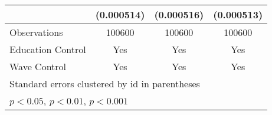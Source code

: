 {\begin{tabular}{l*{3}{c}}
                    &  (0.000514)         &  (0.000516)         &  (0.000513)         \\
\hline
Observations        &      100600         &      100600         &      100600         \\
Education Control   &         Yes         &         Yes         &         Yes         \\
Wave Control        &         Yes         &         Yes         &         Yes         \\
\hline\hline
\multicolumn{4}{l}{\footnotesize \footnotesize Standard errors clustered by id in parentheses}\\
\multicolumn{4}{l}{\footnotesize \footnotesize \sym{*} \(p<0.05\), \sym{**} \(p<0.01\), \sym{***} \(p<0.001\)}\\
\end{tabular}
}
